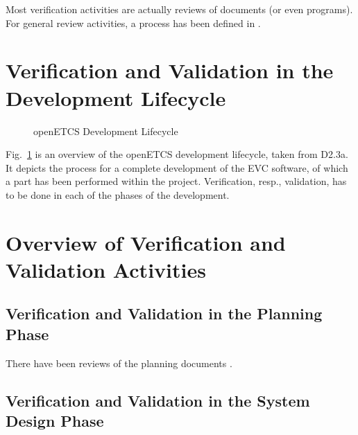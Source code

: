 \documentclass{template/openetcs_article}
\begin{document}
Most verification activities are actually reviews of documents (or
even programs). For general review activities, a process has been
defined in \cite{openETCS:D1.3.1}. 

\newpage







\section{Verification and Validation in the Development Lifecycle}
\label{sec:Lifecycle}

\begin{figure}[hbt]
  \centering
  \def\svgwidth{.9\textwidth}
  {\tiny
  }
  \caption{openETCS Development Lifecycle}
  \label{fig:lifecycle2}
\end{figure}

Fig.~\ref{fig:lifecycle2} is an overview of the openETCS development
lifecycle, taken from D2.3a. It depicts the process for a complete
development of the EVC software, of which a part has been performed
within the project. Verification, resp., validation, has to be done in
each of the phases of the development.

\section{Overview of Verification and Validation Activities}
\label{sec:overview}


\subsection{Verification and Validation in the Planning Phase}
\label{sec:vnv-0}

There have been reviews of the planning documents . 

\subsection{Verification and Validation in the System Design Phase}
\label{sec:vnv-1}
\end{document}

